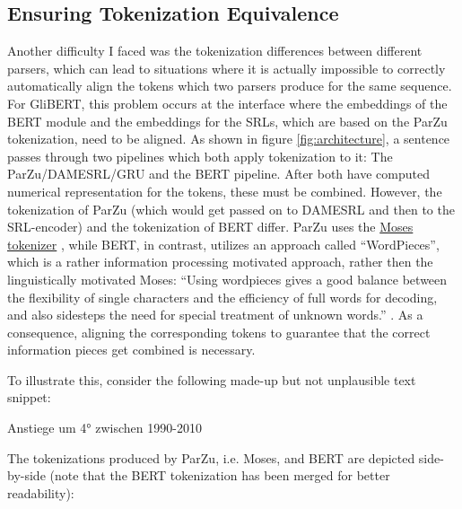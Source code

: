 \subsection{Ensuring Tokenization Equivalence}

Another difficulty I faced was the tokenization differences between different parsers, which can
lead to situations where it is actually impossible to correctly automatically align the tokens
which two parsers produce for the same sequence.
For GliBERT, this problem occurs at the interface where the embeddings of the BERT
module and the embeddings for the SRLs, which are based on the ParZu tokenization,
need to be aligned. As shown in figure \ref{fig:architecture}, a sentence passes
through two pipelines which both apply tokenization to it: The ParZu/DAMESRL/GRU
and the BERT pipeline. After both have computed numerical representation for the
tokens, these must be combined. However, the tokenization of ParZu (which would
get passed on to DAMESRL and then to the SRL-encoder) and the tokenization of BERT
differ. ParZu uses the \href{http://www.statmt.org/moses/}{Moses tokenizer}
\citep{koehn2007moses}, while BERT, in contrast, utilizes an approach called
``WordPieces'', which is a rather information processing motivated approach,
rather then the linguistically motivated Moses: ``Using wordpieces gives a good
balance between the flexibility of single characters and the efficiency of full
words for decoding, and also sidesteps the need for special treatment of unknown
words.'' \citep[p.~2]{wu2016google}. As a consequence, aligning the corresponding
tokens to guarantee that the correct information pieces get combined is necessary.

To illustrate this, consider the following made-up but not unplausible text snippet:

\begin{examples}
	\item \label{itm:tok-sentence} Anstiege um 4° zwischen 1990-2010
\end{examples}

The tokenizations produced by ParZu, i.e. Moses, and BERT are
depicted side-by-side (note that the BERT tokenization has been
merged for better readability):

